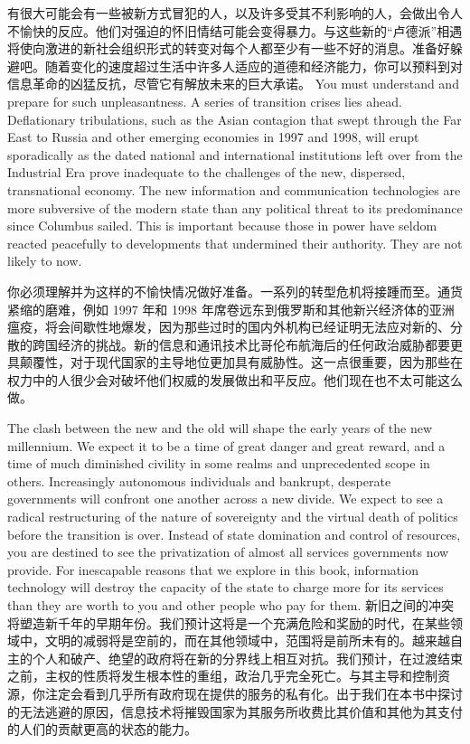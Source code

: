 \begin{paracol}{2}[]
\switchcolumn
有很大可能会有一些被新方式冒犯的人，以及许多受其不利影响的人，会做出令人不愉快的反应。他们对强迫的怀旧情结可能会变得暴力。与这些新的“卢德派”相遇将使向激进的新社会组织形式的转变对每个人都至少有一些不好的消息。准备好躲避吧。随着变化的速度超过生活中许多人适应的道德和经济能力，你可以预料到对信息革命的凶猛反抗，尽管它有解放未来的巨大承诺。
\switchcolumn*
You must understand and prepare for such unpleasantness. A series of transition crises lies ahead. Deflationary tribulations, such as the Asian contagion that swept through the Far East to Russia and other emerging economies in 1997 and 1998, will erupt sporadically as the dated national and international institutions left over from the Industrial Era prove inadequate to the challenges of the new, dispersed, transnational economy. The new information and communication technologies are more subversive of the modern state than any political threat to its predominance since Columbus sailed. This is important because those in power have seldom reacted peacefully to developments that undermined their authority. They are not likely to now.

\switchcolumn
你必须理解并为这样的不愉快情况做好准备。一系列的转型危机将接踵而至。通货紧缩的磨难，例如 1997 年和 1998 年席卷远东到俄罗斯和其他新兴经济体的亚洲瘟疫，将会间歇性地爆发，因为那些过时的国内外机构已经证明无法应对新的、分散的跨国经济的挑战。新的信息和通讯技术比哥伦布航海后的任何政治威胁都要更具颠覆性，对于现代国家的主导地位更加具有威胁性。这一点很重要，因为那些在权力中的人很少会对破坏他们权威的发展做出和平反应。他们现在也不太可能这么做。

\switchcolumn*
The clash between the new and the old will shape the early years of the new millennium. We expect it to be a time of great danger and great reward, and a time of much diminished civility in some realms and unprecedented scope in others. Increasingly autonomous individuals and bankrupt, desperate governments will confront one another across a new divide. We expect to see a radical restructuring of the nature of sovereignty and the virtual death of politics before the transition is over. Instead of state domination and control of resources, you are destined to see the privatization of almost all services governments now provide. For inescapable reasons that we explore in this book, information technology will destroy the capacity of the state to charge more for its services than they are worth to you and other people who pay for them.
\switchcolumn
新旧之间的冲突将塑造新千年的早期年份。我们预计这将是一个充满危险和奖励的时代，在某些领域中，文明的减弱将是空前的，而在其他领域中，范围将是前所未有的。越来越自主的个人和破产、绝望的政府将在新的分界线上相互对抗。我们预计，在过渡结束之前，主权的性质将发生根本性的重组，政治几乎完全死亡。与其主导和控制资源，你注定会看到几乎所有政府现在提供的服务的私有化。出于我们在本书中探讨的无法逃避的原因，信息技术将摧毁国家为其服务所收费比其价值和其他为其支付的人们的贡献更高的状态的能力。

\end{paracol}

